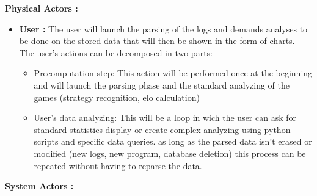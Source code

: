 \documentclass{scrreprt}
\begin{document}
\textbf{Physical Actors :}\\
\begin{itemize}
 \item \textbf{User :} The user will launch the parsing of the logs and demands analyses to be done
   on the stored data that will then be shown in the form of charts.\\
   The user's actions can be decomposed in two parts:
   \begin{itemize}
   \item Precomputation step: This action will be performed once at the beginning and will launch the parsing phase and the standard analyzing of the games (strategy recognition, elo calculation)
   \item User's data analyzing: This will be a loop in wich the user can ask for standard statistics display or create complex analyzing using python scripts and specific data queries. as long as the parsed data isn't erased or modified (new logs, new program, database deletion) this process can be repeated without having to reparse the data.
   \end{itemize}
\end{itemize}
\textbf{System Actors :}\\
\end{document}
